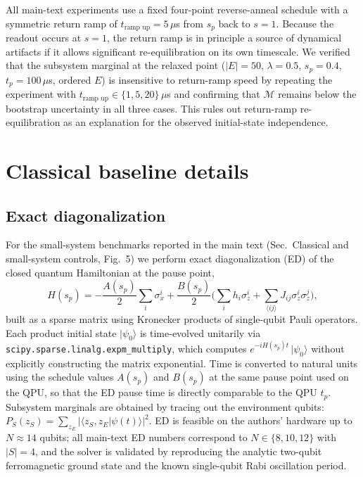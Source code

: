 \documentclass[aps,prapplied,reprint,superscriptaddress,floatfix,nofootinbib]{revtex4-2}
\begin{document}
All main-text experiments use a fixed four-point reverse-anneal schedule with a symmetric return ramp of $t_{\text{ramp up}} = 5\,\mu$s from $s_p$ back to $s=1$.
Because the readout occurs at $s=1$, the return ramp is in principle a source of dynamical artifacts if it allows significant re-equilibration on its own timescale.
We verified that the subsystem marginal at the relaxed point ($|E|=50$, $\lambda=0.5$, $s_p=0.4$, $t_p=100\,\mu$s, ordered $E$) is insensitive to return-ramp speed by repeating the experiment with $t_{\text{ramp up}} \in \{1, 5, 20\}\,\mu$s and confirming that $\mathcal{M}$ remains below the bootstrap uncertainty in all three cases.
This rules out return-ramp re-equilibration as an explanation for the observed initial-state independence.

\section{Classical baseline details}

\subsection{Exact diagonalization}
\label{sec:ed}

For the small-system benchmarks reported in the main text (Sec.~Classical and small-system controls, Fig.~5) we perform exact diagonalization (ED) of the closed quantum Hamiltonian at the pause point,
\begin{equation}
H(s_p) = -\frac{A(s_p)}{2}\sum_i \sigma_x^i + \frac{B(s_p)}{2}\bigg(\sum_i h_i \sigma_z^i + \sum_{\langle ij \rangle} J_{ij}\sigma_z^i \sigma_z^j\bigg),
\end{equation}
built as a sparse matrix using Kronecker products of single-qubit Pauli operators.
Each product initial state $|\psi_0\rangle$ is time-evolved unitarily via \texttt{scipy.sparse.linalg.expm\_multiply}, which computes $e^{-i H(s_p) t}\,|\psi_0\rangle$ without explicitly constructing the matrix exponential.
Time is converted to natural units using the schedule values $A(s_p)$ and $B(s_p)$ at the same pause point used on the QPU, so that the ED pause time is directly comparable to the QPU $t_p$.
Subsystem marginals are obtained by tracing out the environment qubits: $P_S(z_S) = \sum_{z_E} |\langle z_S, z_E|\psi(t)\rangle|^2$.
ED is feasible on the authors' hardware up to $N \approx 14$ qubits; all main-text ED numbers correspond to $N \in \{8, 10, 12\}$ with $|S|=4$, and the solver is validated by reproducing the analytic two-qubit ferromagnetic ground state and the known single-qubit Rabi oscillation period.
\end{document}
